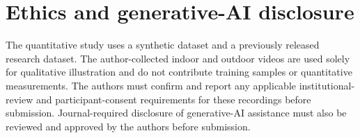 \documentclass[preprint,12pt]{elsarticle}
\begin{document}
\section*{Ethics and generative-AI disclosure}
The quantitative study uses a synthetic dataset and a previously released research dataset. The author-collected indoor and outdoor videos are used solely for qualitative illustration and do not contribute training samples or quantitative measurements. The authors must confirm and report any applicable institutional-review and participant-consent requirements for these recordings before submission. Journal-required disclosure of generative-AI assistance must also be reviewed and approved by the authors before submission.

\setlength{\bibsep}{4pt}


\end{document}
